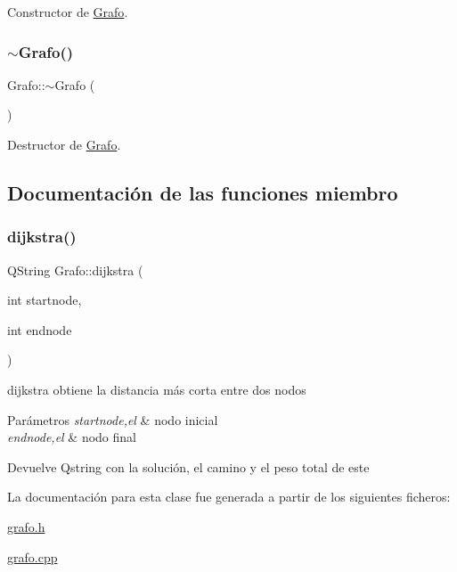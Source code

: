 Constructor de \hyperlink{class_grafo}{Grafo}. 

\mbox{\label{class_grafo_a16f3fbba0de2667dfba3b657cb7e95ff}} 
\subsubsection{\texorpdfstring{$\sim$\+Grafo()}{~Grafo()}}
{\footnotesize\ttfamily Grafo\+::$\sim$\+Grafo (\begin{DoxyParamCaption}{ }\end{DoxyParamCaption})}



Destructor de \hyperlink{class_grafo}{Grafo}. 



\subsection{Documentación de las funciones miembro}
\mbox{\label{class_grafo_a8fe931a9a154866add1bf763dcb88c12}} 
\subsubsection{\texorpdfstring{dijkstra()}{dijkstra()}}
{\footnotesize\ttfamily Q\+String Grafo\+::dijkstra (\begin{DoxyParamCaption}\item[{int}]{startnode,  }\item[{int}]{endnode }\end{DoxyParamCaption})}



dijkstra obtiene la distancia más corta entre dos nodos 


\begin{DoxyParams}{Parámetros}
{\em startnode,el} & nodo inicial \\
\hline
{\em endnode,el} & nodo final \\
\hline
\end{DoxyParams}
\begin{DoxyReturn}{Devuelve}
Qstring con la solución, el camino y el peso total de este 
\end{DoxyReturn}


La documentación para esta clase fue generada a partir de los siguientes ficheros\+:\begin{DoxyCompactItemize}
\item 
\hyperlink{grafo_8h}{grafo.\+h}\item 
\hyperlink{grafo_8cpp}{grafo.\+cpp}\end{DoxyCompactItemize}
